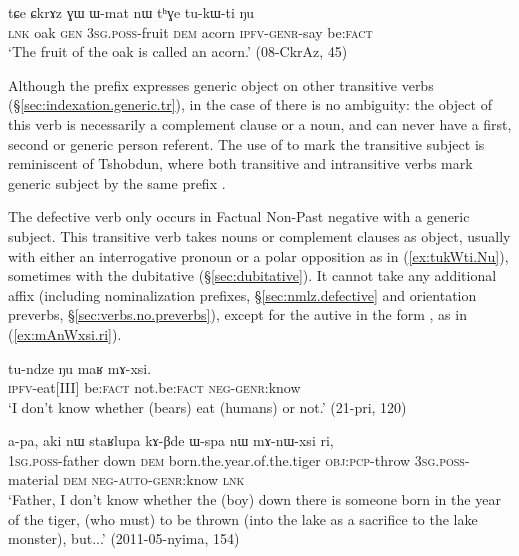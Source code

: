 \begin{exe}
\ex   \label{ex:tukWti.Nu}
 \gll   tɕe ɕkrɤz ɣɯ ɯ-mat nɯ tʰɣe tu-kɯ-ti ŋu \\
 \textsc{lnk} oak \textsc{gen} \textsc{3sg}.\textsc{poss}-fruit \textsc{dem} acorn \textsc{ipfv}-\textsc{genr}-say be:\textsc{fact} \\
 \glt `The fruit of the oak is called an acorn.' (08-CkrAz, 45)
\end{exe}

Although the prefix  expresses generic object on other transitive verbs (§\ref{sec:indexation.generic.tr}), in the case of  there is no ambiguity: the object of this verb is necessarily a complement clause or a noun, and can never have a first, second or generic person referent.  The use of  to mark the transitive subject is reminiscent of Tshobdun, where both transitive and intransitive verbs mark generic subject by the same prefix \citep{sun14generic}. 

The defective verb  only occurs in Factual Non-Past negative with a generic subject. This transitive verb takes nouns or complement clauses as object, usually with either an interrogative pronoun or a polar opposition as in (\ref{ex:tukWti.Nu}), sometimes with the dubitative (§\ref{sec:dubitative}). It cannot take any additional affix (including nominalization prefixes, §\ref{sec:nmlz.defective} and orientation preverbs, §\ref{sec:verbs.no.preverbs}), except for the autive  in the form , as in (\ref{ex:mAnWxsi.ri}). 

\begin{exe}
\ex   \label{ex:Nu.maR.mAxsi}
 \gll  tu-ndze ŋu maʁ mɤ-xsi. \\
 \textsc{ipfv}-eat[III] be:\textsc{fact} not.be:\textsc{fact} \textsc{neg}-\textsc{genr}:know \\
 \glt `I don't know whether (bears) eat (humans) or not.' (21-pri, 120)
\end{exe}

\begin{exe}
\ex   \label{ex:mAnWxsi.ri}
 \gll a-pa, aki nɯ staʁlupa kɤ-βde ɯ-spa nɯ mɤ-nɯ-xsi ri, \\
 \textsc{1sg}.\textsc{poss}-father down \textsc{dem} born.the.year.of.the.tiger \textsc{obj}:\textsc{pcp}-throw \textsc{3sg}.\textsc{poss}-material \textsc{dem} \textsc{neg}-\textsc{auto}-\textsc{genr}:know \textsc{lnk} \\
 \glt `Father, I don't know whether the (boy) down there is someone born in the year of the tiger, (who must) to be thrown (into the lake as a sacrifice to the lake monster), but...' (2011-05-nyima, 154)
\end{exe}

